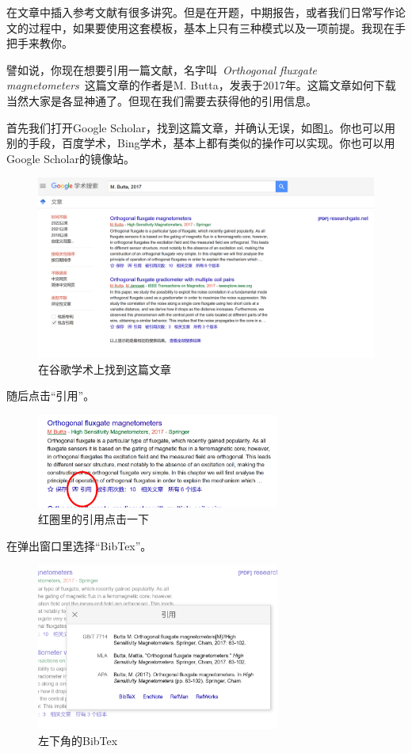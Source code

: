 在文章中插入参考文献有很多讲究。但是在开题，中期报告，或者我们日常写作论文的过程中，如果要使用这套模板，基本上只有三种模式以及一项前提。我现在手把手来教你。\par
{}
譬如说，你现在想要引用一篇文献，名字叫\ \textit{Orthogonal fluxgate magnetometers}\ 这篇文章的作者是M. Butta，发表于2017年。这篇文章如何下载当然大家是各显神通了。但现在我们需要去获得他的引用信息。\par
首先我们打开Google Scholar，找到这篇文章，并确认无误，如图\ref{fig01}。你也可以用别的手段，百度学术，Bing学术，基本上都有类似的操作可以实现。你也可以用Google Scholar的镜像站。\par
\begin{figure}[H]
\label{fig01}
\centering
\includegraphics[width=11.5cm]{PICS/Cite1.png}
\caption{在谷歌学术上找到这篇文章}
\end{figure}\par
随后点击“引用”。
\begin{figure}[H]
\label{fig02}
\centering
\includegraphics[width=8cm]{PICS/Cite2.png}
\caption{红圈里的引用点击一下}
\end{figure}\par
在弹出窗口里选择“BibTex”。
\begin{figure}[H]
\label{fig03}
\centering
\includegraphics[width=8cm]{PICS/Cite3.png}
\caption{左下角的BibTex}
\end{figure}\par

